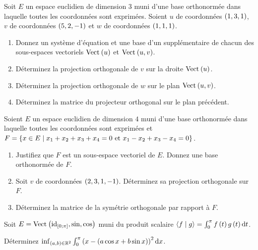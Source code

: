 \begin{exos}
Soit \(E\) un espace euclidien de dimension \(3\) muni d'une base orthonormée dans laquelle toutes les coordonnées sont exprimées. Soient \(u\) de coordonnées \(\left(1,3,1\right)\), \(v\) de coordonnées \(\left(5,2,-1\right)\) et \(w\) de coordonnées \(\left(1,1,1\right)\).

\begin{enumerate}
    \item Donnez un système d'équation et une base d'un supplémentaire de chacun des sous-espaces vectoriels \(\Vect{u}\) et \(\Vect{u,v}\). \\
    \item Déterminez la projection orthogonale de \(v\) sur la droite \(\Vect{u}\). \\
    \item Déterminez la projection orthogonale de \(w\) sur le plan \(\Vect{u,v}\). \\
    \item Déterminez la matrice du projecteur orthogonal sur le plan précédent.
\end{enumerate}
\end{exos}

\begin{exos}
Soient \(E\) un espace euclidien de dimension \(4\) muni d'une base orthonormée dans laquelle toutes les coordonnées sont exprimées et \(F=\left\lbrace x\in E\;\middle|\; x_1+x_2+x_3+x_4=0\text{ et }x_1-x_2+x_3-x_4=0\right\rbrace\).

\begin{enumerate}
    \item Justifiez que \(F\) est un sous-espace vectoriel de \(E\). Donnez une base orthonormée de \(F\). \\
    \item Soit \(v\) de coordonnées \(\left(2,3,1,-1\right)\). Déterminez sa projection orthogonale sur \(F\). \\
    \item Déterminez la matrice de la symétrie orthogonale par rapport à \(F\).
\end{enumerate}
\end{exos}

\begin{exoss}
Soit \(E=\Vect{\id{\intervii{0}{\pi}},\sin,\cos}\) muni du produit scalaire \(\ps{f}{g}=\int_0^\pi f\paren{t}g\paren{t}\odif{t}\).

Déterminez \(\inf_{\paren{a,b}\in\R^2}\int_0^\pi\paren{x-\paren{a\cos x+b\sin x}}^2\odif{x}\).
\end{exoss}

